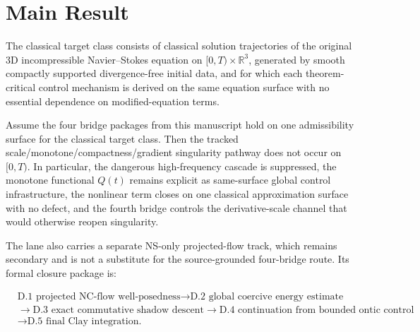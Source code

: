 \section{Main Result}

\begin{definition}
The classical target class consists of classical solution trajectories of the original 3D incompressible Navier--Stokes equation on \([0,T)\times\mathbb{R}^3\), generated by smooth compactly supported divergence-free initial data, and for which each theorem-critical control mechanism is derived on the same equation surface with no essential dependence on modified-equation terms.
\end{definition}

\begin{theorem}
\label{thm:classical-closure}
Assume the four bridge packages from this manuscript hold on one admissibility
surface for the classical target class. Then the tracked
scale/monotone/compactness/gradient singularity pathway does not occur on
\([0,T)\). In particular, the dangerous high-frequency cascade is suppressed,
the monotone functional \(Q(t)\) remains explicit as same-surface global
control infrastructure, the nonlinear term closes on one classical
approximation surface with no defect, and the fourth bridge controls the
derivative-scale channel that would otherwise reopen singularity.
\end{theorem}

The lane also carries a separate NS-only projected-flow track, which remains
secondary and is not a substitute for the source-grounded four-bridge route.
Its formal closure package is:

\[
\begin{aligned}
&\text{D.1 projected NC-flow well-posedness}
\to \text{D.2 global coercive energy estimate}\\
&\to \text{D.3 exact commutative shadow descent}
\to \text{D.4 continuation from bounded ontic control}\\
&\to \text{D.5 final Clay integration.}
\end{aligned}
\]


